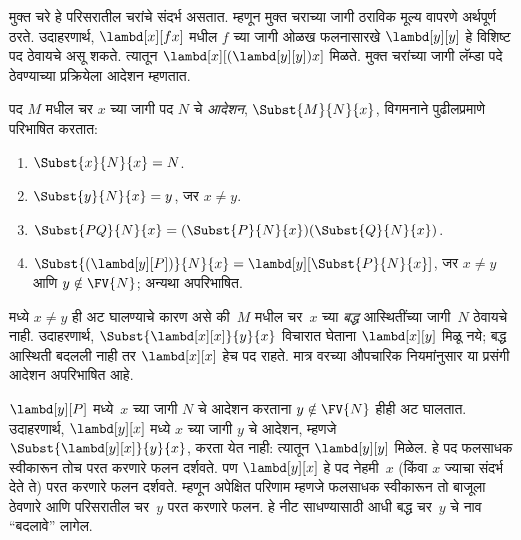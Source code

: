 \documentclass[../../../include/open-logic-section]{subfiles}
\begin{document}

\begin{explain}
मुक्त चरे हे परिसरातील चरांचे संदर्भ असतात. म्हणून मुक्त
चराच्या जागी ठराविक मूल्य वापरणे अर्थपूर्ण ठरते. उदाहरणार्थ,
$\lambd[x][f x]$ मधील $f$ च्या जागी ओळख फलनासारखे
$\lambd[y][y]$ हे विशिष्ट पद ठेवायचे असू शकते. त्यातून
$\lambd[x][(\lambd[y][y]) x]$ मिळते. मुक्त चरांच्या जागी
लॅम्डा पदे ठेवण्याच्या प्रक्रियेला आदेशन म्हणतात.
\end{explain}

\begin{defn}[आदेशन] 
  पद $M$ मधील चर $x$ च्या जागी पद $N$ चे
  \emph{आदेशन}, $\Subst{M}{N}{x}$, विगमनाने पुढीलप्रमाणे
  परिभाषित करतात:
  \begin{enumerate}
    \item $\Subst{x}{N}{x} = N$. 
    \item $\Subst{y}{N}{x}  = y$, जर $x \neq y$. 
    \item $\Subst{PQ}{N}{x}  = (\Subst{P}{N}{x}) (\Subst{Q}{N}{x})$.
    \item $\Subst{(\lambd[y][P])}{N}{x} = \lambd[y][\Subst{P}{N}{x}]$,
      जर $x \neq y$ आणि $y \notin \FV{N}$; अन्यथा अपरिभाषित.
  \end{enumerate}
\end{defn}

\begin{explain}
 मध्ये
$x \neq y$ ही अट घालण्याचे कारण असे की~$M$ मधील
चर~$x$ च्या \emph{बद्ध} आस्थितींच्या जागी~$N$ ठेवायचे नाही.
उदाहरणार्थ, $\Subst{\lambd[x][x]}{y}{x}$ विचारात घेताना
$\lambd[x][y]$ मिळू नये; बद्ध आस्थिती बदलली नाही तर
$\lambd[x][x]$ हेच पद राहते. मात्र वरच्या औपचारिक
नियमांनुसार या प्रसंगी आदेशन अपरिभाषित आहे.

$\lambd[y][P]$ मध्ये~$x$ च्या जागी $N$ चे आदेशन करताना
$y \notin \FV{N}$ हीही अट घालतात. उदाहरणार्थ,
$\lambd[y][x]$ मध्ये $x$ च्या जागी $y$ चे आदेशन,
म्हणजे $\Subst{\lambd[y][x]}{y}{x}$, करता येत नाही:
त्यातून $\lambd[y][y]$ मिळेल. हे पद फलसाधक स्वीकारून
तोच परत करणारे फलन दर्शवते. पण $\lambd[y][x]$ हे पद
नेहमी~$x$ (किंवा $x$ ज्याचा संदर्भ देते ते) परत करणारे
फलन दर्शवते. म्हणून अपेक्षित परिणाम म्हणजे फलसाधक
स्वीकारून तो बाजूला ठेवणारे आणि परिसरातील चर~$y$
परत करणारे फलन. हे नीट साधण्यासाठी आधी बद्ध चर~$y$
चे नाव ``बदलावे'' लागेल.
\end{explain}
\end{document}
